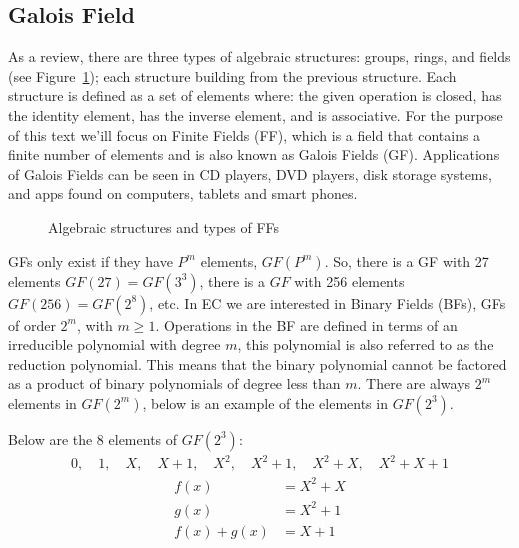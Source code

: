 \subsection{Galois Field} 
As a review, there are three types of algebraic structures: groups, rings, and fields (see Figure~\ref{fig:DH:DHKE_3}); each structure building from the previous structure.  Each structure is defined as a set of elements where: the given operation is closed, has the identity element, has the inverse element, and is associative. For the purpose of this text we'ill focus on Finite Fields (FF), which is a field that contains a finite number of elements and is also known as Galois Fields (GF). Applications of Galois Fields can be seen in CD players, DVD players, disk storage systems, and apps found on computers, tablets and smart phones.
\begin{figure}[H]
	  \caption{\label{fig:DH:DHKE_3} Algebraic structures and types of FFs }
\end{figure}
 GFs only exist if they have $P^m$ elements, $GF(P^m)$. So, there is a GF with 27 elements $GF(27) = GF(3^3)$, there is a $GF$ with 256 elements $GF(256) = GF(2^8)$, etc.  In EC we are interested in Binary Fields (BFs), GFs of order $2^m$, with $m ≥ 1$.  Operations in the BF are defined in terms of an irreducible polynomial with degree $m$, this polynomial is also referred to as the reduction polynomial.  This means that the binary polynomial cannot be factored as a product of binary polynomials of degree less than $m$.  There are always $2^m$ elements in $GF(2^m)$, below is an example of the elements in $GF(2^3)$.  
\newline \newline
\begin{eg} Below are the 8 elements of $GF(2^3)$:
\begin{align*}
0, \quad 1, \quad X, \quad X +1, \quad X^2, \quad X^2+1, \quad X^2 + X, \quad X^2 + X + 1
 \end{align*}
\begin{align*}
	f(x) &= X^2 + X\\
	g(x) &= X^2  + 1\\
           f(x) + g(x) &= X  + 1
 \end{align*}
\end{eg}
